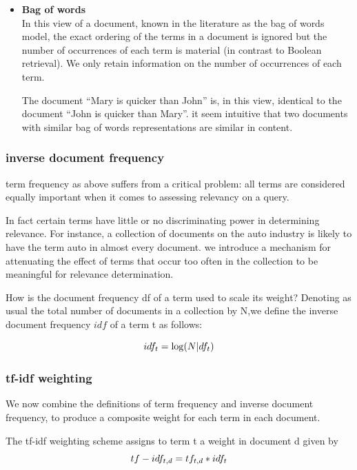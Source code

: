 \begin{itemize}
     \item \textbf{Bag of words}\\
     In this view of a document, known in the literature as the bag
     of words model, the exact ordering of the terms in a document is ignored but
     the number of occurrences of each term is material (in contrast to Boolean
     retrieval). 
     We only retain information on the number of occurrences of each term. 
    
     The document “Mary is quicker than John” is, in this view, identical to the document “John is quicker than Mary”. it seem intuitive that two documents with similar bag of words representations are
     similar in content.
\end{itemize} 

\subsubsection{inverse document frequency}

term frequency as above suffers from a critical problem: all terms are
considered equally important when it comes to assessing relevancy on a
query. 

In fact certain terms have little or no discriminating power in determining
relevance. For instance, a collection of documents on the auto
industry is likely to have the term auto in almost every document.
we introduce a mechanism for attenuating the effect of terms that occur
too often in the collection to be meaningful for relevance determination.


How is the document frequency df of a term used to scale its weight? 
Denoting as usual the total number of documents in a collection by N,we define the inverse document frequency \( idf \) of a term t as follows:

\begin{equation}
        \large 
            idf_{t} = \log (N | df_{t})\end{equation}

\subsubsection{tf-idf weighting}

We now combine the definitions of term frequency and inverse document
frequency, to produce a composite weight for each term in each document.

The tf-idf weighting scheme assigns to term t a weight in document d given
by
\begin{equation}
    \large
     tf-idf_{t,d} = tf_{t,d } * idf_{t} \end{equation}  
     
